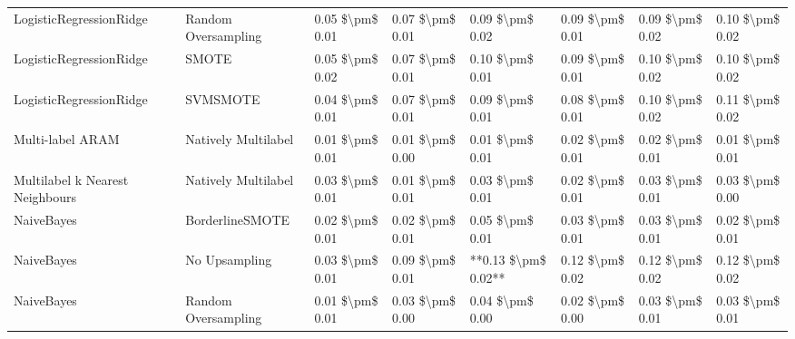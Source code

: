 \begin{tabular}{llllllll}
        LogisticRegressionRidge &           Random Oversampling & 0.05 \$\textbackslash pm\$ 0.01 &           0.07 \$\textbackslash pm\$ 0.01 &       0.09 \$\textbackslash pm\$ 0.02 &        0.09 \$\textbackslash pm\$ 0.01 &                         0.09 \$\textbackslash pm\$ 0.02 & 0.10 \$\textbackslash pm\$ 0.02 \\
        LogisticRegressionRidge &                         SMOTE & 0.05 \$\textbackslash pm\$ 0.02 &           0.07 \$\textbackslash pm\$ 0.01 &       0.10 \$\textbackslash pm\$ 0.01 &        0.09 \$\textbackslash pm\$ 0.01 &                         0.10 \$\textbackslash pm\$ 0.02 & 0.10 \$\textbackslash pm\$ 0.02 \\
        LogisticRegressionRidge &                      SVMSMOTE & 0.04 \$\textbackslash pm\$ 0.01 &           0.07 \$\textbackslash pm\$ 0.01 &       0.09 \$\textbackslash pm\$ 0.01 &        0.08 \$\textbackslash pm\$ 0.01 &                         0.10 \$\textbackslash pm\$ 0.02 & 0.11 \$\textbackslash pm\$ 0.02 \\
               Multi-label ARAM &           Natively Multilabel & 0.01 \$\textbackslash pm\$ 0.01 &           0.01 \$\textbackslash pm\$ 0.00 &       0.01 \$\textbackslash pm\$ 0.01 &        0.02 \$\textbackslash pm\$ 0.01 &                         0.02 \$\textbackslash pm\$ 0.01 & 0.01 \$\textbackslash pm\$ 0.01 \\
Multilabel k Nearest Neighbours &           Natively Multilabel & 0.03 \$\textbackslash pm\$ 0.01 &           0.01 \$\textbackslash pm\$ 0.01 &       0.03 \$\textbackslash pm\$ 0.01 &        0.02 \$\textbackslash pm\$ 0.01 &                         0.03 \$\textbackslash pm\$ 0.01 & 0.03 \$\textbackslash pm\$ 0.00 \\
                     NaiveBayes &               BorderlineSMOTE & 0.02 \$\textbackslash pm\$ 0.01 &           0.02 \$\textbackslash pm\$ 0.01 &       0.05 \$\textbackslash pm\$ 0.01 &        0.03 \$\textbackslash pm\$ 0.01 &                         0.03 \$\textbackslash pm\$ 0.01 & 0.02 \$\textbackslash pm\$ 0.01 \\
                     NaiveBayes &                 No Upsampling & 0.03 \$\textbackslash pm\$ 0.01 &           0.09 \$\textbackslash pm\$ 0.01 &   **0.13 \$\textbackslash pm\$ 0.02** &        0.12 \$\textbackslash pm\$ 0.02 &                         0.12 \$\textbackslash pm\$ 0.02 & 0.12 \$\textbackslash pm\$ 0.02 \\
                     NaiveBayes &           Random Oversampling & 0.01 \$\textbackslash pm\$ 0.01 &           0.03 \$\textbackslash pm\$ 0.00 &       0.04 \$\textbackslash pm\$ 0.00 &        0.02 \$\textbackslash pm\$ 0.00 &                         0.03 \$\textbackslash pm\$ 0.01 & 0.03 \$\textbackslash pm\$ 0.01 \\

\end{tabular}
